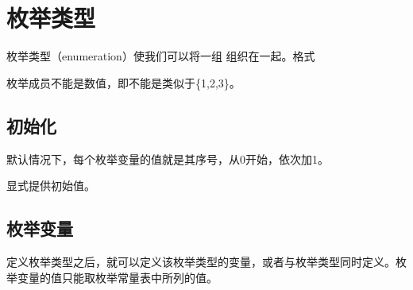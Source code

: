 \documentclass[letterpaper,10pt,english]{sphinxmanual}
\begin{document}
\section{枚举类型}
\label{\detokenize{cpp/17_enum::doc}}\label{\detokenize{cpp/17_enum:id1}}
枚举类型（enumeration）使我们可以将一组  组织在一起。格式

%
\begin{sphinxVerbatim}[commandchars=\\\{\}]
  
\end{sphinxVerbatim}

枚举成员不能是数值，即不能是类似于\{1,2,3\}。


\subsection{初始化}
\label{\detokenize{cpp/17_enum:id2}}
默认情况下，每个枚举变量的值就是其序号，从0开始，依次加1。

%
\begin{sphinxVerbatim}[commandchars=\\\{\}]
        
\end{sphinxVerbatim}

显式提供初始值。

%
\begin{sphinxVerbatim}[commandchars=\\\{\}]
        
\end{sphinxVerbatim}


\subsection{枚举变量}
\label{\detokenize{cpp/17_enum:id3}}
定义枚举类型之后，就可以定义该枚举类型的变量，或者与枚举类型同时定义。枚举变量的值只能取枚举常量表中所列的值。
\end{document}

